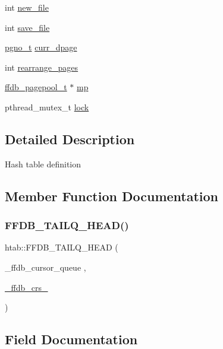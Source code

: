 \begin{DoxyCompactItemize}
int \mbox{\hyperlink{structhtab_ac52b8a6b13ecefc3a22bc34cc6086765}{new\+\_\+file}}
\item 
int \mbox{\hyperlink{structhtab_ae130587a915749306b8f12b54c592545}{save\+\_\+file}}
\item 
\mbox{\hyperlink{other__libs_2filedb_2filehash_2ffdb__db_8h_a000813331643d38481142bcce7de1501}{pgno\+\_\+t}} \mbox{\hyperlink{structhtab_ab19afd3577916a17ccb184cbefe45629}{curr\+\_\+dpage}}
\item 
int \mbox{\hyperlink{structhtab_af3b2be98fadf5037c0b44dedc5c2c08d}{rearrange\+\_\+pages}}
\item 
\mbox{\hyperlink{ffdb__pagepool_8h_a73290f737b0e5f8be90a0fa96ddf6ab6}{ffdb\+\_\+pagepool\+\_\+t}} $\ast$ \mbox{\hyperlink{structhtab_ac6813e280d41ce4bb7641ffea6ec9065}{mp}}
\item 
pthread\+\_\+mutex\+\_\+t \mbox{\hyperlink{structhtab_a74c24a124724588e43ed76d6dea81b74}{lock}}
\end{DoxyCompactItemize}


\subsection{Detailed Description}
Hash table definition 

\subsection{Member Function Documentation}
\mbox{\label{structhtab_af19d4f4f4be39bcc1bca0509bef5c3cf}} 
\subsubsection{\texorpdfstring{FFDB\_TAILQ\_HEAD()}{FFDB\_TAILQ\_HEAD()}}
{\footnotesize\ttfamily htab\+::\+F\+F\+D\+B\+\_\+\+T\+A\+I\+L\+Q\+\_\+\+H\+E\+AD (\begin{DoxyParamCaption}\item[{\+\_\+ffdb\+\_\+cursor\+\_\+queue}]{,  }\item[{\mbox{\hyperlink{struct__ffdb__crs__}{\+\_\+ffdb\+\_\+crs\+\_\+}}}]{ }\end{DoxyParamCaption})}



\subsection{Field Documentation}
\mbox{\label{structhtab_ae1cdd71f91fd6dcfa3b17f1f2e293d59}} 
